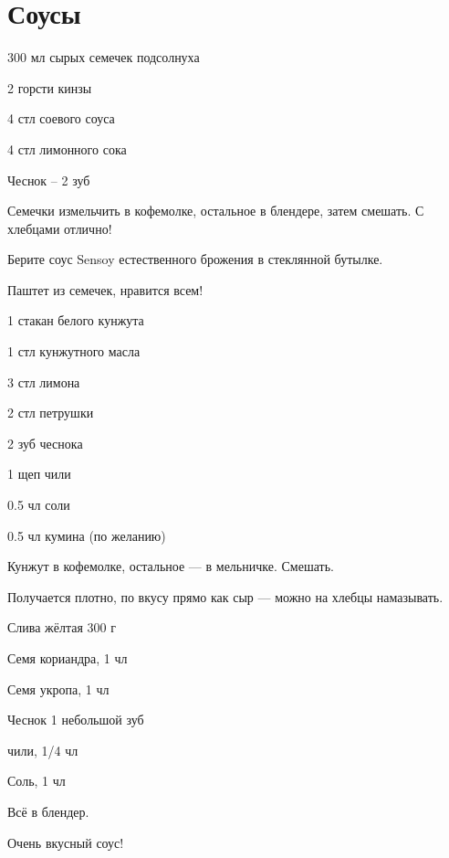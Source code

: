 \chapter*{Соусы}
\label{sec:sauces}


{\label{aiolli}
\item 300 мл сырых семечек подсолнуха
\item 2 горсти кинзы 
\item 4 стл соевого соуса
\item 4 стл лимонного сока
}{
\item Чеснок – 2 зуб
}{
Семечки измельчить в кофемолке, остальное в блендере, затем смешать. С хлебцами отлично!
}{
\begin{advice}
\item Берите соус Sensoy естественного брожения в стеклянной бутылке.
\item Паштет из семечек, нравится всем!
\end{advice}}{}



{\label{takini}
\item 1 стакан белого кунжута 
\item 1 стл кунжутного масла
\item 3 стл лимона
\item 2 стл петрушки
}{
\item 2 зуб чеснока
\item 1 щеп чили
\item 0.5 чл соли
\item 0.5 чл кумина (по желанию)
}{
Кунжут в кофемолке, остальное — в мельничке. Смешать. 
}{
\begin{advice}
\item Получается плотно, по вкусу прямо как сыр — можно на хлебцы намазывать.
\end{advice}}{}



{
\item Слива жёлтая 300 г
}{
\item Семя кориандра, 1 чл
\item Семя укропа, 1 чл
\item Чеснок 1 небольшой зуб
\item чили, 1/4 чл
\item Соль, 1 чл
}{
Всё в блендер.  
}{
\begin{advice}
\item Очень вкусный соус! 
\end{advice}}{}



